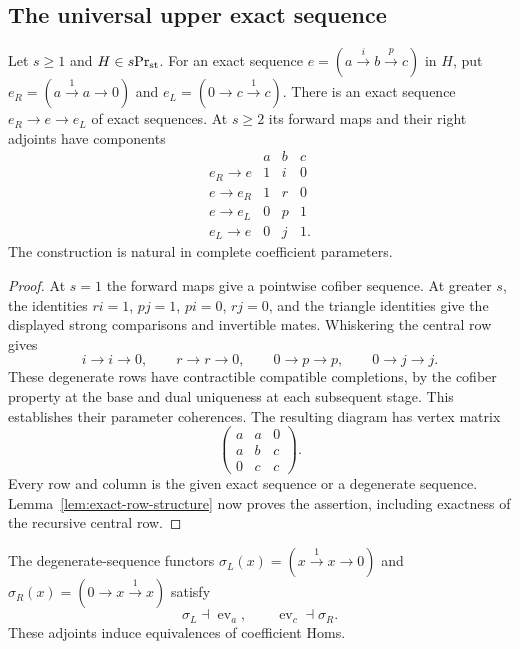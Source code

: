 \subsection{The universal upper exact sequence}

\begin{lemma}\label{lem:canonical-row-maps}
Let \(s\ge1\) and \(H\in {s}\mathrm{Pr}_{\mathrm{st}}\).
For an exact sequence $e=(a\xrightarrow{i}b\xrightarrow{p}c)$ in \(H\), put
$e_R=(a\xrightarrow1a\to0)$ and
$e_L=(0\to c\xrightarrow1c)$. There is an exact sequence
$e_R\to e\to e_L$ of exact sequences. At $s\geq2$ its
forward maps and their right adjoints have components
\begin{equation}\label{eq:fnd-upper-components}
\begin{array}{c|ccc}
 &a&b&c\\\hline
 e_R\longrightarrow e&1&i&0\\
 e\longrightarrow e_R&1&r&0\\
 e\longrightarrow e_L&0&p&1\\
 e_L\longrightarrow e&0&j&1.
\end{array}
\end{equation}
The construction is natural in complete coefficient parameters.
\end{lemma}

\begin{proof}
At $s=1$ the forward maps give a pointwise cofiber sequence.
At greater $s$, the identities $ri=1$, $pj=1$, $pi=0$, $rj=0$, and the
triangle identities give the displayed strong comparisons and
invertible mates. Whiskering the central row gives
\[
 i\to i\to0,\qquad r\to r\to0,\qquad
 0\to p\to p,\qquad0\to j\to j.
\]
These degenerate rows have contractible compatible completions,
by the cofiber property at the base and dual uniqueness at each
subsequent stage. This establishes their parameter coherences.
The resulting diagram has vertex matrix
\[
 \begin{pmatrix}a&a&0\\a&b&c\\0&c&c\end{pmatrix}.
\]
Every row and column is the given exact sequence or a degenerate sequence.
Lemma~\ref{lem:exact-row-structure} now proves the assertion,
including exactness of the recursive central row.
\end{proof}

The degenerate-sequence functors
$\sigma_L(x)=(x\xrightarrow1x\to0)$ and
$\sigma_R(x)=(0\to x\xrightarrow1x)$ satisfy
\begin{equation}\label{eq:row-evaluation-adjunctions}
 \sigma_L\dashv\operatorname{ev}_a,\qquad
 \operatorname{ev}_c\dashv\sigma_R.
\end{equation}
These adjoints induce equivalences of coefficient Homs.


